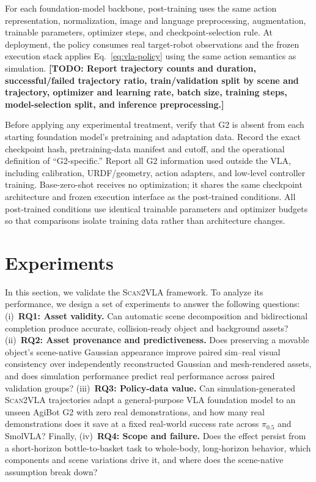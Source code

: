 \documentclass[letterpaper,10pt,conference]{ieeeconf}
\newcommand{\system}{\textsc{Scan2VLA}}
\newcommand{\todo}[1]{\textbf{[TODO: #1]}}
\newcommand{\piHalf}{\ensuremath{\pi_{0.5}}}
\begin{document}
For each foundation-model backbone, post-training uses the same action representation,
normalization, image and language preprocessing, augmentation, trainable
parameters, optimizer steps, and checkpoint-selection rule. At deployment, the
policy consumes real target-robot observations and the frozen execution stack applies
Eq.~\eqref{eq:vla-policy} using the same action semantics as simulation.
\todo{Report trajectory counts and duration, successful/failed trajectory
ratio, train/validation split by scene and trajectory, optimizer and learning
rate, batch size, training steps, model-selection split, and inference
preprocessing.}

Before applying any experimental treatment, verify that G2 is absent from each
starting foundation model's pretraining and adaptation data. Record the exact
checkpoint hash, pretraining-data manifest and cutoff, and the operational
definition of ``G2-specific.'' Report all G2 information used outside the VLA,
including calibration, URDF/geometry, action adapters, and low-level controller
training. Base-zero-shot receives no optimization; it shares the same checkpoint
architecture and frozen execution interface as the post-trained conditions. All
post-trained conditions use identical trainable parameters and optimizer budgets
so that comparisons isolate training data rather than architecture changes.

\section{Experiments}
\label{sec:experiments}

In this section, we validate the \system{} framework. To analyze its
performance, we design a set of experiments to answer the following questions:
(i)~\textbf{RQ1: Asset validity.} Can automatic scene decomposition and
bidirectional completion produce
accurate, collision-ready object and background assets?
(ii)~\textbf{RQ2: Asset provenance and predictiveness.} Does preserving a
movable object's scene-native Gaussian appearance improve paired sim--real
visual consistency over independently reconstructed Gaussian and mesh-rendered
assets, and does simulation performance predict real performance across paired
validation groups? (iii)~\textbf{RQ3: Policy-data value.} Can simulation-generated
\system{} trajectories adapt a general-purpose VLA foundation model to an unseen
AgiBot G2 with zero real demonstrations,
and how many real demonstrations does it save at a fixed real-world success rate
across \piHalf{} and SmolVLA? Finally, (iv)~\textbf{RQ4: Scope and failure.}
Does the effect persist from a short-horizon bottle-to-basket task to whole-body,
long-horizon behavior, which components and scene variations drive it, and where
does the scene-native assumption break down?
\end{document}
